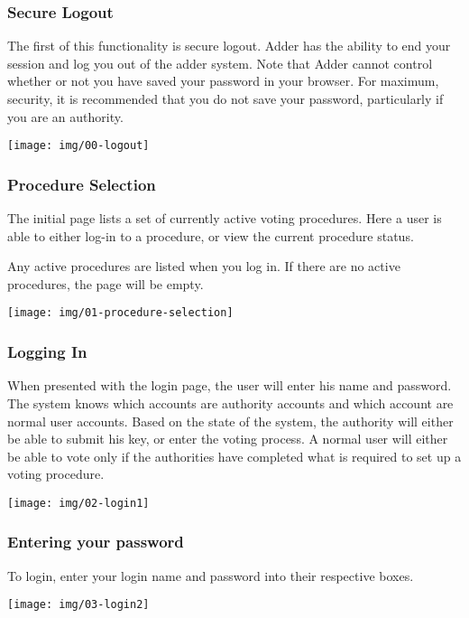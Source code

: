 \documentclass[letterpaper,10pt]{article}
\begin{document}
\subsubsection{Secure Logout}

The first of this functionality is secure logout. Adder has the
ability to end your session and log you out of the adder system.
Note that Adder cannot control whether or not you have saved your
password in your browser. For maximum, security, it is recommended
that you do not save your password, particularly if you are an
authority.

\texttt{[image: img/00-logout]}

\subsubsection{Procedure Selection}

The initial page lists a set of currently active voting procedures.
Here a user is able to either log-in to a procedure, or view the
current procedure status.

Any active procedures are listed when you log in. If there are no
active procedures, the page will be empty.

\texttt{[image: img/01-procedure-selection]}

\subsubsection{Logging In}

When presented with the login page, the user will enter his name and
password. The system knows which accounts are authority accounts and
which account are normal user accounts. Based on the state of the
system, the authority will either be able to submit his key, or
enter the voting process. A normal user will either be able to vote
only if the authorities have completed what is required to set up a
voting procedure.

\texttt{[image: img/02-login1]}

\subsubsection{Entering your password}

To login, enter your login name and password into their respective
boxes.

\texttt{[image: img/03-login2]}
\end{document}
